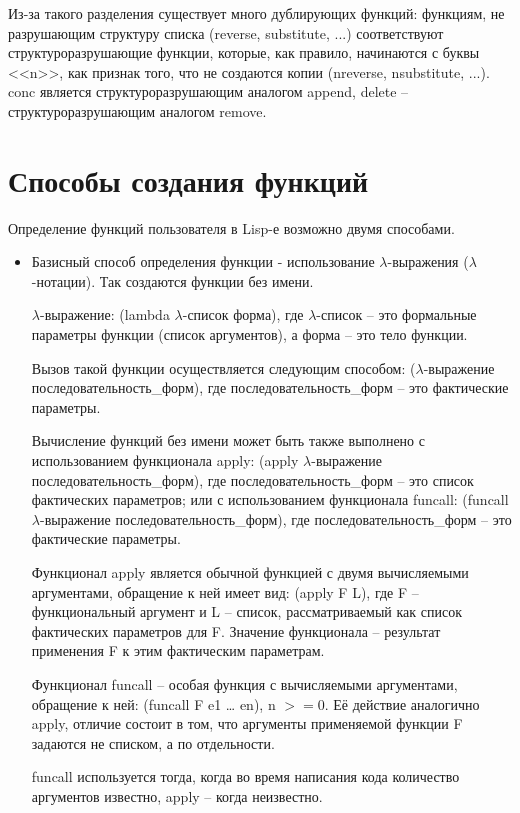\documentclass[12pt]{report}
\begin{document}
Из-за такого разделения существует много дублирующих функций: функциям, не разрушающим структуру списка (reverse, substitute, ...) соответствуют структуроразрушающие функции, которые, как правило, начинаются с буквы <<n>>, как признак того, что не создаются копии (nreverse, nsubstitute, ...). conc является структуроразрушающим аналогом append, delete -- структуроразрушающим аналогом remove.

\section*{Способы создания функций}

Определение функций пользователя в Lisp-е возможно двумя способами.


\begin{itemize}
	\item Базисный способ  определения  функции - использование $\lambda$-выражения ($\lambda$-нотации). Так создаются функции без имени.
	
	$\lambda$-выражение: (lambda $\lambda$-список форма), 
	где $\lambda$-список --  это формальные параметры функции (список аргументов), а форма -- это тело функции.
	
	Вызов такой функции осуществляется следующим способом: ($\lambda$-выражение последовательность\_форм), 
	где последовательность\_форм -- это фактические параметры.
	
	Вычисление функций без имени может быть также выполнено с использованием функционала apply: (apply $\lambda$-выражение последовательность\_форм), где последовательность\_форм -- это список фактических параметров; или с использованием функционала funcall: (funcall $\lambda$-выражение последовательность\_форм), где последовательность\_форм -- это фактические параметры.
	
	Функционал apply является обычной функцией с двумя  вычисляемыми аргументами, обращение к ней имеет вид: (apply F L), где F – функциональный аргумент и L -- список, рассматриваемый как список фактических параметров для F. Значение функционала -- результат применения F к этим фактическим параметрам.
	
	Функционал funcall – особая функция с вычисляемыми аргументами, обращение к ней: (funcall F e1 … en), n $>= 0$. Её   действие аналогично apply, отличие состоит в том, что аргументы  применяемой функции F задаются не списком, а по отдельности. 
	
	funcall используется тогда, когда во время написания кода количество аргументов известно, apply -- когда неизвестно.
	

\end{itemize}
\end{document}
